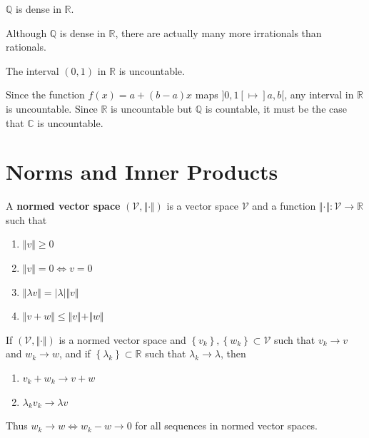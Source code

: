 \documentclass[twoside,10pt]{report}
\begin{document}
\begin{prop}
$\mathbb{Q}$ is dense in $\mathbb{R}$.
\end{prop}

Although $\mathbb{Q}$ is dense in $\mathbb{R}$, there are actually many more irrationals than rationals.

\begin{prop}[]
	The interval $(0,1)$ in $\mathbb{R}$ is uncountable.
\end{prop}

Since the function $f(x) = a + (b-a)x$ maps $]0,1[ \mapsto ]a,b[$, any interval in $\mathbb{R}$ is uncountable. Since $\mathbb{R}$ is uncountable but $\mathbb{Q}$ is countable, it must be the case that $\mathbb{C}$ is uncountable.

\section{Norms and Inner Products}

\begin{defn}[]
	A \textbf{normed vector space} $(\mathcal{V}, \Vert{\cdot}\Vert)$ is a vector space $\mathcal{V}$ and a function $\Vert{\cdot}\Vert:\mathcal{V}\to\mathbb{R}$ such that
	\begin{enumerate}
		\item $\Vert{v}\Vert\geq 0$ 
		\item $\Vert{v}\Vert=0 \iff v=0$
		\item $\Vert{\lambda v}\Vert=|\lambda| \Vert{v}\Vert$ 
		\item $\Vert{v+w}\Vert\leq \Vert{v}\Vert+\Vert{w}\Vert$
	\end{enumerate}
\end{defn}

\begin{prop}
	If $(\mathcal{V},\Vert{\cdot}\Vert)$ is a normed vector space and $\left\{ v_k \right\}, \left\{ w_k \right\} \subset \mathcal{V}$ such that $v_k \to v$ and $w_k \to w$, and if $\left\{ \lambda_k \right\} \subset \mathbb{R}$ such that $\lambda_k \to \lambda$, then
	\begin{enumerate}
		\item $v_k + w_k \to v+w$
		\item $\lambda_k v_k \to \lambda v$
	\end{enumerate}
\end{prop}

Thus $w_k \to w \iff w_k - w \to 0$ for all sequences in normed vector spaces.
\end{document}
